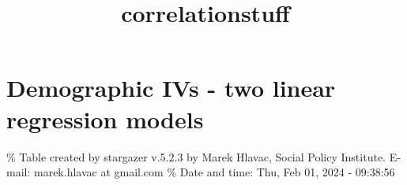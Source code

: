 \documentclass[
]{article}
\title{correlationstuff}
\author{}
\date{\vspace{-2.5em}}
\begin{document}
\maketitle

{
\setcounter{tocdepth}{2}
\tableofcontents
}
\newpage

\hypertarget{demographic-ivs---two-linear-regression-models}{%
\section{Demographic IVs - two linear regression
models}\label{demographic-ivs---two-linear-regression-models}}

\begingroup\setlength{\tabcolsep}{1pt}\renewcommand{\arraystretch}{0.7}

\% Table created by stargazer v.5.2.3 by Marek Hlavac, Social Policy
Institute. E-mail: marek.hlavac at gmail.com \% Date and time: Thu, Feb
01, 2024 - 09:38:56
\end{document}
